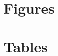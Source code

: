 \documentclass[twocolumn]{bmcart}%
\begin{document}
\begin{backmatter}



\section*{Figures}


\section*{Tables}


\end{backmatter}
\end{document}
